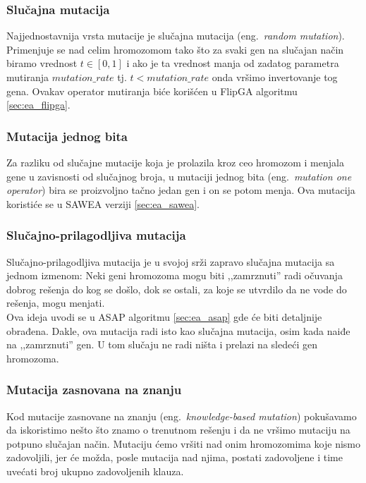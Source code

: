 \documentclass{article}
\begin{document}
\subsubsection{Slučajna mutacija}
\label{sec:ea_slucajna_mutacija}
Najjednostavnija vrsta mutacije je slučajna mutacija (eng.~{\em random mutation}).
Primenjuje se nad celim hromozomom tako što za svaki gen 
na slučajan način biramo vrednost $t \in [0,1]$ i ako je ta vrednost manja od zadatog
parametra mutiranja $mutation\_rate$ tj. $ t < mutation\_rate$ 
onda vršimo invertovanje tog gena.
Ovakav operator mutiranja biće korišćen u FlipGA algoritmu \ref{sec:ea_flipga}.

\subsubsection{Mutacija jednog bita}
\label{sec:ea_mutacija_one}
Za razliku od slučajne mutacije koja je prolazila kroz ceo hromozom i menjala gene u
zavisnosti od slučajnog broja, u mutaciji jednog bita (eng.~{\em mutation one operator})
bira se proizvoljno tačno jedan gen i on se potom menja. 
Ova mutacija koristiće se u SAWEA verziji \ref{sec:ea_sawea}.

\subsubsection{Slučajno-prilagodljiva mutacija}
\label{sec:ea_slucajno_prilagodljiva_mutacija}
Slučajno-prilagodljiva mutacija je u svojoj srži zapravo slučajna mutacija sa jednom izmenom:
Neki geni hromozoma mogu biti ,,zamrznuti'' radi očuvanja dobrog rešenja do kog se došlo,
dok se ostali, za koje se utvrdilo da ne vode do rešenja, mogu menjati.\\

Ova ideja uvodi se u ASAP algoritmu \ref{sec:ea_asap} gde će biti detaljnije obrađena.
Dakle, ova mutacija radi isto kao slučajna mutacija, osim kada naiđe na ,,zamrznuti'' gen.
U tom slučaju ne radi ništa i prelazi na sledeći gen hromozoma.

\subsubsection{Mutacija zasnovana na znanju}
\label{sec:ea_mutacija_znanje}
Kod mutacije zasnovane na znanju (eng.~{\em knowledge-based mutation})
pokušavamo da iskoristimo nešto što znamo o trenutnom rešenju
i da ne vršimo mutaciju na potpuno slučajan način.
Mutaciju ćemo vršiti nad onim hromozomima koje nismo zadovoljili, 
jer će možda, posle mutacija nad njima, postati zadovoljene i time uvećati broj ukupno
zadovoljenih klauza.\\
\end{document}
